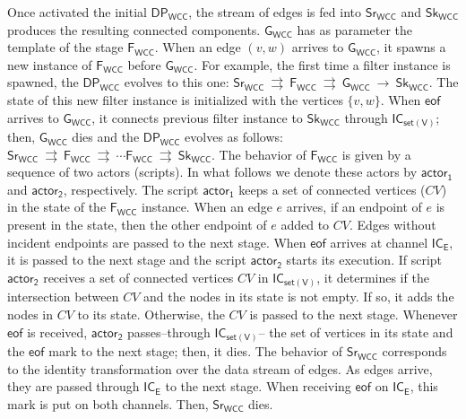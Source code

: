\documentclass[preprint]{elsarticle}
\newcommand{\dpwcc}{\mathsf{DP_{WCC}}}
\newcommand{\iwc}{\mathsf{Sr_{WCC}}}
\newcommand{\owc}{\mathsf{Sk_{WCC}}}
\newcommand{\fwc}{\mathsf{F_{WCC}}}
\newcommand{\gwc}{\mathsf{G_{WCC}}}
\newcommand{\ice}{\mathsf{IC_E}}
\newcommand{\csofv}{\mathsf{IC_{set(V)}}}
\newcommand{\eof}{\mathsf{eof}}
\newcommand{\Act}{\mathsf{actor_1}}
\newcommand{\Actt}{\mathsf{actor_2}}
\begin{document}
 Once activated the initial $\dpwcc$, the stream of edges is fed into $\iwc$ and $\owc$ produces the resulting connected components. $\gwc$ has as parameter the template of the stage  $\fwc$. When an edge $(v,w)$ arrives to $\gwc$, it  spawns a new instance of $\fwc$ before $\gwc$. For example, the first time a filter instance is spawned, the $\dpwcc$ evolves to this one: $\iwc \:\rightrightarrows\: \fwc \:\rightrightarrows\: \gwc \:\rightarrow \: \owc$. The state of this new filter instance is initialized with the vertices $\{v,w\}$. When $\eof$ arrives to $\gwc$, it connects previous filter instance to $\owc$ through $\csofv$; then, $\gwc$ dies and the $\dpwcc$ evolves as follows: $\iwc \:\rightrightarrows\: \fwc \:\rightrightarrows\: \cdots \fwc \:\rightrightarrows \: \owc$. The behavior of $\fwc$ is given by a sequence of two actors (scripts). In what follows we denote these actors by $\Act$ and $\Actt$, respectively. The script $\Act$ keeps a set of connected vertices ($CV$) in the state of the $\fwc$ instance. When an edge $e$ arrives, if an endpoint of $e$ is present in the state, then the other endpoint of $e$ added to $CV$.  Edges without incident endpoints are passed to the next stage. When $\eof$ arrives at channel $\ice$, it is passed to the next stage and the script $\Actt$ starts its execution.  If script $\Actt$ receives a set of connected vertices $CV$ in $\csofv$, it determines if the intersection between $CV$ and the nodes in its state is not empty. If so, it adds the nodes in $CV$  to its state. Otherwise, the $CV$ is passed to the next stage.  Whenever $\eof$ is received, $\Actt$ passes--through $\csofv$-- the set of vertices in its state and the $\eof$ mark to the next stage; then, it dies.
 The behavior of $\iwc$ corresponds to  the identity transformation over the data stream of edges.  As edges arrive, they are passed through  $\ice$ to the next stage. When receiving $\eof$ on $\ice$, this mark is put on both channels. Then, $\iwc$ dies. 
 

\end{document}
